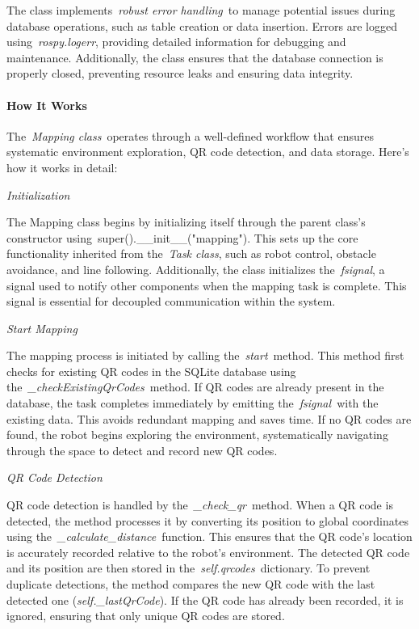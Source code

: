 \documentclass[a4paper,12pt]{extreport}
\begin{document}
The class implements~\emph{robust error handling}~to manage potential
issues during database operations, such as table creation or data
insertion. Errors are logged using~\emph{rospy.logerr}, providing
detailed information for debugging and maintenance. Additionally, the
class ensures that the database connection is properly closed,
preventing resource leaks and ensuring data integrity.

\paragraph{How It Works}

The~\emph{Mapping class}~operates through a well-defined workflow that
ensures systematic environment exploration, QR code detection, and data
storage. Here's how it works in detail:

\emph{Initialization}

The Mapping class begins by initializing itself through the parent
class's constructor using~super().\_\_init\_\_("mapping"). This sets up
the core functionality inherited from the~\emph{Task class}, such as
robot control, obstacle avoidance, and line following. Additionally, the
class initializes the~\emph{fsignal}, a signal used to notify other
components when the mapping task is complete. This signal is essential
for decoupled communication within the system.

\emph{Start Mapping}

The mapping process is initiated by calling the~\emph{start}~method.
This method first checks for existing QR codes in the SQLite database
using the~\emph{\_checkExistingQrCodes}~method. If QR codes are already
present in the database, the task completes immediately by emitting
the~\emph{fsignal~}with the existing data. This avoids redundant mapping
and saves time. If no QR codes are found, the robot begins exploring the
environment, systematically navigating through the space to detect and
record new QR codes.

\emph{QR Code Detection}

QR code detection is handled by the~\emph{\_check\_qr}~method. When a QR
code is detected, the method processes it by converting its position to
global coordinates using the~\emph{\_calculate\_distance}~function. This
ensures that the QR code's location is accurately recorded relative to
the robot's environment. The detected QR code and its position are then
stored in the~\emph{self.qrcodes}~dictionary. To prevent duplicate
detections, the method compares the new QR code with the last detected
one (\emph{self.\_lastQrCode}). If the QR code has already been
recorded, it is ignored, ensuring that only unique QR codes are stored.
\end{document}
